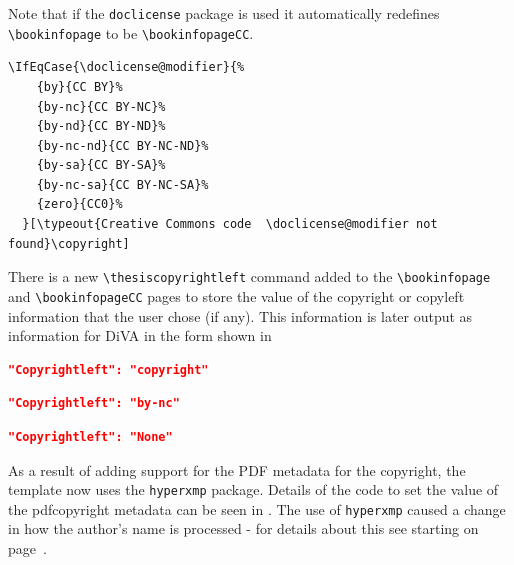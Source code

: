 Note that if the \texttt{doclicense} package is used it automatically redefines \texttt{\textbackslash bookinfopage} to be \texttt{\textbackslash bookinfopageCC}.

\begin{lstlisting}[language={[LaTeX]TeX}, caption={Case statement in \textbackslash bookinfopageCC}, label=lst:bookinfopageCCcaseSTMT]
  \IfEqCase{\doclicense@modifier}{%
    {by}{CC BY}%
    {by-nc}{CC BY-NC}%
    {by-nd}{CC BY-ND}%
    {by-nc-nd}{CC BY-NC-ND}%
    {by-sa}{CC BY-SA}%
    {by-nc-sa}{CC BY-NC-SA}%
    {zero}{CC0}%
  }[\typeout{Creative Commons code  \doclicense@modifier not found}\copyright]
\end{lstlisting}

There is a new \texttt{\textbackslash thesiscopyrightleft} command added to the \texttt{\textbackslash bookinfopage} and \texttt{\textbackslash bookinfopageCC} pages to store the value of the copyright or copyleft information that the user chose (if any). This information is later output as information for DiVA in the form shown in 
\begin{lstlisting}[language=json, caption={If the user chose to have a copyright on the bookinfo page}, label=lst:bookinfoCopyrightselected]
"Copyrightleft": "copyright"
\end{lstlisting}

\begin{lstlisting}[language=json, caption={If the user chose to have a CC BY-NC license on the bookinfo page}, label=lst:bookinfoCopyleftselected]
"Copyrightleft": "by-nc"
\end{lstlisting}

\begin{lstlisting}[language=json, caption={If the user chose \textbf{not} to have a bookinfo page}, label=lst:bookinfoNoneselected]
"Copyrightleft": "None"
\end{lstlisting}

As a result of adding support for the PDF metadata for the copyright, the template now uses the \texttt{hyperxmp} package. Details of the code to set the value of the pdfcopyright metadata can be seen in .
The use of \texttt{hyperxmp} caused a change in how the author's name is processed - for details about this see  starting on page~\pageref{sec:addingKeywordsAndMetaDataToPDF}.

